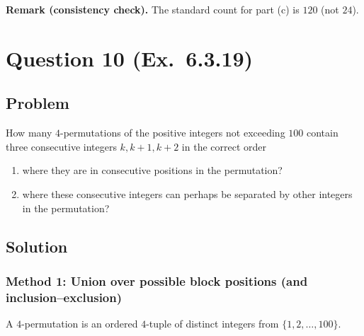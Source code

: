 \documentclass[12pt]{article}
\begin{document}
\noindent\textbf{Remark (consistency check).} The standard count for part (c) is $120$ (not $24$).

\newpage

\section{Question 10 (Ex.\ 6.3.19)}
\subsection{Problem}
How many $4$-permutations of the positive integers not exceeding $100$ contain three consecutive integers $k,k+1,k+2$ in the correct order
\begin{enumerate}[label=(\alph*)]
\item where they are in consecutive positions in the permutation?
\item where these consecutive integers can perhaps be separated by other integers in the permutation?
\end{enumerate}

\subsection{Solution}

\subsubsection{Method 1: Union over possible block positions (and inclusion--exclusion)}
A $4$-permutation is an ordered $4$-tuple of distinct integers from $\{1,2,\dots,100\}$.
\end{document}
